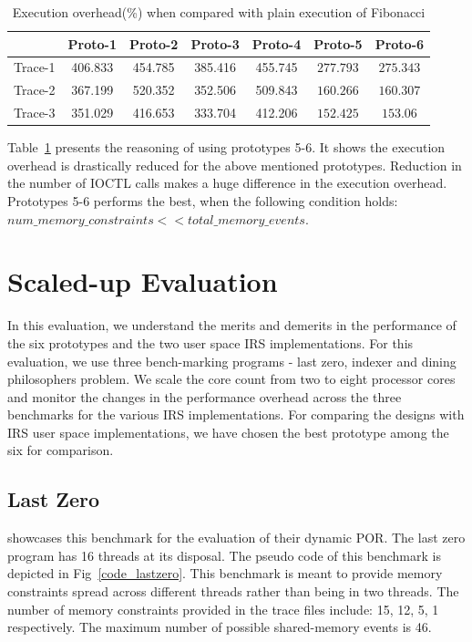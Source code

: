\begin{table}[h]
\begin{center}
 \begin{tabular}{|c c c c c c c|} 
 \hline
 & Proto-1 & Proto-2 & Proto-3 & Proto-4 & Proto-5 & Proto-6\\ %
 \hline
 Trace-1 & 406.833 & 454.785 & 385.416 & 455.745 & $277.793$ & $275.343$ \\ 
 Trace-2 & 367.199 & 520.352 & 352.506 & 509.843 & $160.266$ & $160.307$ \\
 Trace-3 & 351.029 & 416.653 & 333.704 & 412.206 & $152.425$ & $153.06$\\
 \hline
\end{tabular}
\end{center}
\caption{Execution overhead(\%) when compared with plain execution of Fibonacci}
\label{fib_exec_over}
\end{table}

Table~\ref{fib_exec_over} presents the reasoning of using prototypes 5-6. 
It shows the execution overhead is drastically reduced for the above mentioned prototypes. 
Reduction in the number of IOCTL calls makes a huge difference in the execution overhead. 
Prototypes 5-6 performs the best, when the following condition holds:
$num\_memory\_constraints << total\_memory\_events$.

\section{Scaled-up Evaluation}

In this evaluation, we understand the merits and demerits in the performance of the six prototypes and the two user space IRS implementations. 
For this evaluation, we use three bench-marking programs - last zero, indexer and dining philosophers problem. 
We scale the core count from two to eight processor cores and monitor the changes in the performance overhead across the three benchmarks for the various IRS implementations. 
For comparing the designs with IRS user space implementations, we have chosen the best prototype among the six for comparison. 

\subsection{Last Zero}

\citet{abdulla2014optimal} showcases this benchmark for the evaluation of their dynamic POR. 
The last zero program has 16 threads at its disposal. 
The pseudo code of this benchmark is depicted in Fig~\ref{code_lastzero}. 
This benchmark is meant to provide memory constraints spread across different threads rather than being in two threads. 
The number of memory constraints provided in the trace files include: 15, 12, 5, 1 respectively. 
The maximum number of possible shared-memory events is 46.


